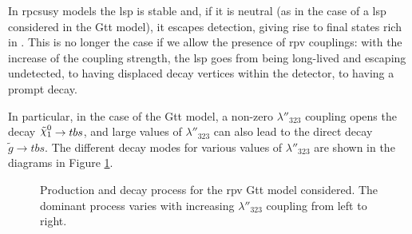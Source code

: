 In \gls{rpcsusy} models the \gls{lsp} is stable and, if it is neutral (as in the case of a \ninoone \gls{lsp} 
considered in the Gtt model), it escapes detection, giving rise to final states rich in \met. 
This is no longer the case if we allow the presence of \gls{rpv} couplings: with the increase of the 
coupling strength, the \gls{lsp} goes from being 
long-lived and escaping undetected, to having displaced decay vertices within the detector, to  
having a prompt decay. 

In particular, in the case of the Gtt model, a non-zero $\lambda''_{323}$ coupling opens the decay 
$\ninoone \rightarrow t b s$, and large values  of $\lambda''_{323}$ can also lead to the 
direct decay $\tilde{g} \rightarrow t b s$. The different decay modes for various values of  
$\lambda''_{323}$ are shown in the diagrams in Figure \ref{fig:rpcrpv_diagrams}.
 

\begin{figure}[htbp]
	\centering 
	\caption{Production and decay process for the \gls{rpv} Gtt model considered.
	 The dominant process varies with increasing $\lambda''_{323}$ coupling from left to right.}
	\label{fig:rpcrpv_diagrams}
\end{figure}

